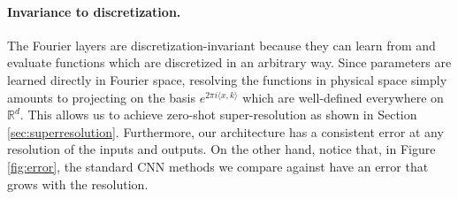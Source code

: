 \documentclass{article} %
\newcommand{\R}{\mathbb{R}}
\newcommand{\nik}[1]{\textcolor{blue}{{\bf Nik:}  #1}}
\newcommand{\cG}{\mathcal{F}}
\begin{document}




\paragraph{Invariance to discretization.}
The Fourier layers are discretization-invariant because they can learn from and evaluate functions which are discretized in an arbitrary way. Since parameters are learned directly in Fourier space, resolving the functions in physical space simply amounts to projecting on the basis $e^{2\pi i \langle x, k \rangle}$ which are well-defined everywhere on $\R^d$. This allows us to achieve zero-shot super-resolution as shown in Section \ref{sec:superresolution}.
Furthermore, our architecture has a consistent error at any resolution of the inputs and outputs. On the other hand, notice that, in Figure \ref{fig:error}, the standard CNN methods we compare against have an error that grows with the resolution.  
\end{document}
